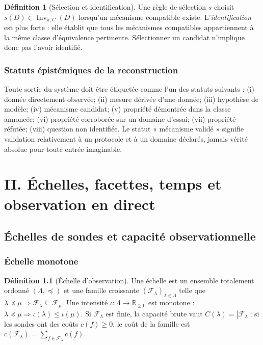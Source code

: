 \documentclass[11pt,oneside]{book}
\theoremstyle{definition}
\newtheorem{definition}[theoreme]{Définition}
\theoremstyle{remark}
\newcommand{\Fcal}{\mathcal F}
\newcommand{\R}{\mathbb R}
\newcommand{\1}{\mathbf 1}
\newcommand{\Inv}{\operatorname{Inv}}
\begin{document}
\begin{definition}[Sélection et identification]
Une règle de sélection $s$ choisit $s(D)\in\Inv_{\pi,C}(D)$ lorsqu'un mécanisme compatible existe. L'\emph{identification} est plus forte : elle établit que tous les mécanismes compatibles appartiennent à la même classe d'équivalence pertinente. Sélectionner un candidat n'implique donc pas l'avoir identifié.
\end{definition}

\section{Statuts épistémiques de la reconstruction}
Toute sortie du système doit être étiquetée comme l'un des statuts suivants : (i) donnée directement observée; (ii) mesure dérivée d'une donnée; (iii) hypothèse de modèle; (iv) mécanisme candidat; (v) propriété démontrée dans la classe annoncée; (vi) propriété corroborée sur un domaine d'essai; (vii) propriété réfutée; (viii) question non identifiée. Le statut « mécanisme validé » signifie validation relativement à un protocole et à un domaine déclarés, jamais vérité absolue pour toute entrée imaginable.

\part{II. Échelles, facettes, temps et observation en direct}

\chapter{Échelles de sondes et capacité observationnelle}
\section{Échelle monotone}
\begin{definition}[Échelle d'observation]
Une échelle est un ensemble totalement ordonné $(\Lambda,\preceq)$ et une famille croissante $(\Fcal_\lambda)_{\lambda\in\Lambda}$ telle que $\lambda\preceq\mu\Rightarrow\Fcal_\lambda\subseteq\Fcal_\mu$. Une intensité $\iota:\Lambda\to\R_{\geq0}$ est monotone : $\lambda\preceq\mu\Rightarrow\iota(\lambda)\leq\iota(\mu)$. Si $\Fcal_\lambda$ est finie, la capacité brute vaut $C(\lambda)=|\Fcal_\lambda|$; si les sondes ont des coûts $c(f)\geq0$, le coût de la famille est $c(\Fcal_\lambda)=\sum_{f\in\Fcal_\lambda}c(f)$.
\end{definition}
\end{document}
